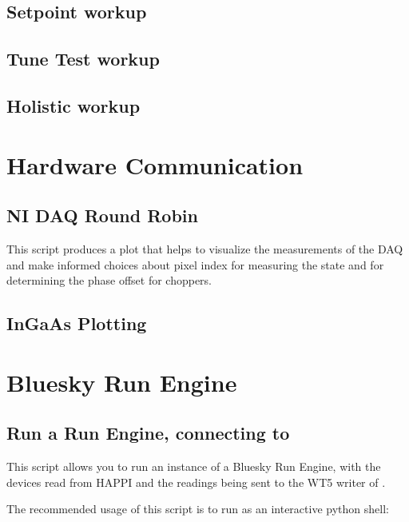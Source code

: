 \subsection{Setpoint workup}
\clearpage

\subsection{Tune Test workup}
\clearpage

\subsection{Holistic workup}

\clearpage

\section{Hardware Communication}  

\subsection{NI DAQ Round Robin}

This script produces a plot that helps to visualize the measurements of the DAQ and make informed choices about pixel index for measuring the state and for determining the phase offset for choppers.

\clearpage


\subsection{InGaAs Plotting}

\clearpage

\section{Bluesky Run Engine}  


\subsection{Run a Run Engine, connecting to \biab}
\label{apx:script:re}

This script allows you to run an instance of a Bluesky Run Engine, with the devices read from HAPPI and the readings being sent to the WT5 writer of \biab.

The recommended usage of this script is to run as an interactive python shell:



\clearpage
